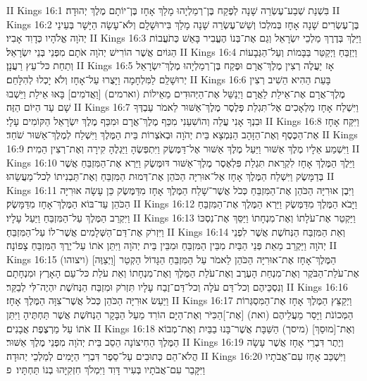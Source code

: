 II Kings 16:1	בִּשְׁנַת שְׁבַע־עֶשְׂרֵה שָׁנָה לְפֶקַח בֶּן־רְמַלְיָהוּ מָלַךְ אָחָז בֶּן־יוֹתָם מֶלֶךְ יְהוּדָה׃
II Kings 16:2	בֶּן־עֶשְׂרִים שָׁנָה אָחָז בְּמלְכוֹ וְשֵׁשׁ־עֶשְׂרֵה שָׁנָה מָלַךְ בִּירוּשָׁלָ͏ִם וְלֹא־עָשָׂה הַיָּשָׁר בְּעֵינֵי יְהֹוָה אֱלֹהָיו כְּדָוִד אָבִיו׃
II Kings 16:3	וַיֵּלֶךְ בְּדֶרֶךְ מַלְכֵי יִשְׂרָאֵל וְגַם אֶת־בְּנוֹ הֶעֱבִיר בָּאֵשׁ כְּתֹעֲבוֹת הַגּוֹיִם אֲשֶׁר הוֹרִישׁ יְהֹוָה אֹתָם מִפְּנֵי בְּנֵי יִשְׂרָאֵל׃
II Kings 16:4	וַיְזַבֵּחַ וַיְקַטֵּר בַּבָּמוֹת וְעַל־הַגְּבָעוֹת וְתַחַת כּל־עֵץ רַעֲנָן׃
II Kings 16:5	אָז יַעֲלֶה רְצִין מֶלֶךְ־אֲרָם וּפֶקַח בֶּן־רְמַלְיָהוּ מֶלֶךְ־יִשְׂרָאֵל יְרוּשָׁלַ͏ִם לַמִּלְחָמָה וַיָּצֻרוּ עַל־אָחָז וְלֹא יָכְלוּ לְהִלָּחֵם׃
II Kings 16:6	בָּעֵת הַהִיא הֵשִׁיב רְצִין מֶלֶךְ־אֲרָם אֶת־אֵילַת לַאֲרָם וַיְנַשֵּׁל אֶת־הַיְּהוּדִים מֵאֵילוֹת (וארמים) [וַאֲדֹמִים] בָּאוּ אֵילַת וַיֵּשְׁבוּ שָׁם עַד הַיּוֹם הַזֶּה׃
II Kings 16:7	וַיִּשְׁלַח אָחָז מַלְאָכִים אֶל־תִּגְלַת פְּלֶסֶר מֶלֶךְ־אַשּׁוּר לֵאמֹר עַבְדְּךָ וּבִנְךָ אָנִי עֲלֵה וְהוֹשִׁעֵנִי מִכַּף מֶלֶךְ־אֲרָם וּמִכַּף מֶלֶךְ יִשְׂרָאֵל הַקּוֹמִים עָלָי׃
II Kings 16:8	וַיִּקַּח אָחָז אֶת־הַכֶּסֶף וְאֶת־הַזָּהָב הַנִּמְצָא בֵּית יְהֹוָה וּבְאֹצְרוֹת בֵּית הַמֶּלֶךְ וַיִּשְׁלַח לְמֶלֶךְ־אַשּׁוּר שֹׁחַד׃
II Kings 16:9	וַיִּשְׁמַע אֵלָיו מֶלֶךְ אַשּׁוּר וַיַּעַל מֶלֶךְ אַשּׁוּר אֶל־דַּמֶּשֶׂק וַיִּתְפְּשֶׂהָ וַיַּגְלֶהָ קִירָה וְאֶת־רְצִין הֵמִית׃
II Kings 16:10	וַיֵּלֶךְ הַמֶּלֶךְ אָחָז לִקְרַאת תִּגְלַת פִּלְאֶסֶר מֶלֶךְ־אַשּׁוּר דּוּמֶּשֶׂק וַיַּרְא אֶת־הַמִּזְבֵּחַ אֲשֶׁר בְּדַמָּשֶׂק וַיִּשְׁלַח הַמֶּלֶךְ אָחָז אֶל־אוּרִיָּה הַכֹּהֵן אֶת־דְּמוּת הַמִּזְבֵּחַ וְאֶת־תַּבְנִיתוֹ לְכל־מַעֲשֵׂהוּ׃
II Kings 16:11	וַיִּבֶן אוּרִיָּה הַכֹּהֵן אֶת־הַמִּזְבֵּחַ כְּכֹל אֲשֶׁר־שָׁלַח הַמֶּלֶךְ אָחָז מִדַּמֶּשֶׂק כֵּן עָשָׂה אוּרִיָּה הַכֹּהֵן עַד־בּוֹא הַמֶּלֶךְ־אָחָז מִדַּמָּשֶׂק׃
II Kings 16:12	וַיָּבֹא הַמֶּלֶךְ מִדַּמֶּשֶׂק וַיַּרְא הַמֶּלֶךְ אֶת־הַמִּזְבֵּחַ וַיִּקְרַב הַמֶּלֶךְ עַל־הַמִּזְבֵּחַ וַיַּעַל עָלָיו׃
II Kings 16:13	וַיַּקְטֵר אֶת־עֹלָתוֹ וְאֶת־מִנְחָתוֹ וַיַּסֵּךְ אֶת־נִסְכּוֹ וַיִּזְרֹק אֶת־דַּם־הַשְּׁלָמִים אֲשֶׁר־לוֹ עַל־הַמִּזְבֵּחַ׃
II Kings 16:14	וְאֵת הַמִּזְבַּח הַנְּחֹשֶׁת אֲשֶׁר לִפְנֵי יְהֹוָה וַיַּקְרֵב מֵאֵת פְּנֵי הַבַּיִת מִבֵּין הַמִּזְבֵּחַ וּמִבֵּין בֵּית יְהֹוָה וַיִּתֵּן אֹתוֹ עַל־יֶרֶךְ הַמִּזְבֵּחַ צָפוֹנָה׃
II Kings 16:15	(ויצוהו) [וַיְצַוֶּה] הַמֶּלֶךְ־אָחָז אֶת־אוּרִיָּה הַכֹּהֵן לֵאמֹר עַל הַמִּזְבֵּחַ הַגָּדוֹל הַקְטֵר אֶת־עֹלַת־הַבֹּקֶר וְאֶת־מִנְחַת הָעֶרֶב וְאֶת־עֹלַת הַמֶּלֶךְ וְאֶת־מִנְחָתוֹ וְאֵת עֹלַת כּל־עַם הָאָרֶץ וּמִנְחָתָם וְנִסְכֵּיהֶם וְכל־דַּם עֹלָה וְכל־דַּם־זֶבַח עָלָיו תִּזְרֹק וּמִזְבַּח הַנְּחֹשֶׁת יִהְיֶה־לִּי לְבַקֵּר׃
II Kings 16:16	וַיַּעַשׂ אוּרִיָּה הַכֹּהֵן כְּכֹל אֲשֶׁר־צִוָּה הַמֶּלֶךְ אָחָז׃
II Kings 16:17	וַיְקַצֵּץ הַמֶּלֶךְ אָחָז אֶת־הַמִּסְגְּרוֹת הַמְּכוֹנֹת וַיָּסַר מֵעֲלֵיהֶם (ואת) [אֶת־]הַכִּיֹּר וְאֶת־הַיָּם הוֹרִד מֵעַל הַבָּקָר הַנְּחֹשֶׁת אֲשֶׁר תַּחְתֶּיהָ וַיִּתֵּן אֹתוֹ עַל מַרְצֶפֶת אֲבָנִים׃
II Kings 16:18	וְאֶת־[מוּסַךְ] (מיסך) הַשַּׁבָּת אֲשֶׁר־בָּנוּ בַבַּיִת וְאֶת־מְבוֹא הַמֶּלֶךְ הַחִיצוֹנָה הֵסֵב בֵּית יְהֹוָה מִפְּנֵי מֶלֶךְ אַשּׁוּר׃
II Kings 16:19	וְיֶתֶר דִּבְרֵי אָחָז אֲשֶׁר עָשָׂה הֲלֹא־הֵם כְּתוּבִים עַל־סֵפֶר דִּבְרֵי הַיָּמִים לְמַלְכֵי יְהוּדָה׃
II Kings 16:20	וַיִּשְׁכַּב אָחָז עִם־אֲבֹתָיו וַיִּקָּבֵר עִם־אֲבֹתָיו בְּעִיר דָּוִד וַיִּמְלֹךְ חִזְקִיָּהוּ בְנוֹ תַּחְתָּיו׃ {פ}
